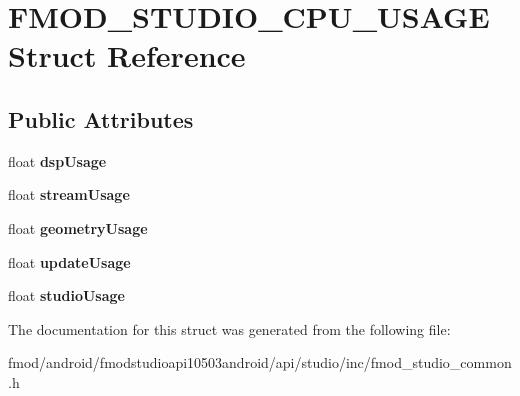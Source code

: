 \hypertarget{struct_f_m_o_d___s_t_u_d_i_o___c_p_u___u_s_a_g_e}{\section{F\+M\+O\+D\+\_\+\+S\+T\+U\+D\+I\+O\+\_\+\+C\+P\+U\+\_\+\+U\+S\+A\+G\+E Struct Reference}
\label{struct_f_m_o_d___s_t_u_d_i_o___c_p_u___u_s_a_g_e}
}
\subsection*{Public Attributes}
\begin{DoxyCompactItemize}
\item 
\hypertarget{struct_f_m_o_d___s_t_u_d_i_o___c_p_u___u_s_a_g_e_ab25a7c33f8ae2ce322380afa8dfaea3d}{float {\bfseries dsp\+Usage}}\label{struct_f_m_o_d___s_t_u_d_i_o___c_p_u___u_s_a_g_e_ab25a7c33f8ae2ce322380afa8dfaea3d}

\item 
\hypertarget{struct_f_m_o_d___s_t_u_d_i_o___c_p_u___u_s_a_g_e_a7ead639bed1a76bd0fd519f15aa65e97}{float {\bfseries stream\+Usage}}\label{struct_f_m_o_d___s_t_u_d_i_o___c_p_u___u_s_a_g_e_a7ead639bed1a76bd0fd519f15aa65e97}

\item 
\hypertarget{struct_f_m_o_d___s_t_u_d_i_o___c_p_u___u_s_a_g_e_a648936d6389ed658c11e021d1408ebfb}{float {\bfseries geometry\+Usage}}\label{struct_f_m_o_d___s_t_u_d_i_o___c_p_u___u_s_a_g_e_a648936d6389ed658c11e021d1408ebfb}

\item 
\hypertarget{struct_f_m_o_d___s_t_u_d_i_o___c_p_u___u_s_a_g_e_ae49190e8bf588fb836bfd47869d2f901}{float {\bfseries update\+Usage}}\label{struct_f_m_o_d___s_t_u_d_i_o___c_p_u___u_s_a_g_e_ae49190e8bf588fb836bfd47869d2f901}

\item 
\hypertarget{struct_f_m_o_d___s_t_u_d_i_o___c_p_u___u_s_a_g_e_ab41a46e15600d4950ec9eaade59d45ab}{float {\bfseries studio\+Usage}}\label{struct_f_m_o_d___s_t_u_d_i_o___c_p_u___u_s_a_g_e_ab41a46e15600d4950ec9eaade59d45ab}

\end{DoxyCompactItemize}


The documentation for this struct was generated from the following file\+:\begin{DoxyCompactItemize}
\item 
fmod/android/fmodstudioapi10503android/api/studio/inc/fmod\+\_\+studio\+\_\+common.\+h\end{DoxyCompactItemize}
